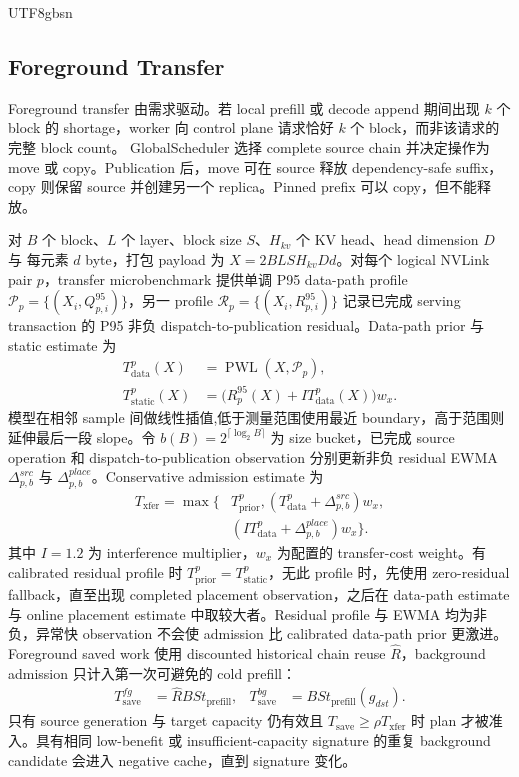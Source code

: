 \documentclass[11pt,a4paper]{article}
\begin{document}
\begin{CJK*}{UTF8}{gbsn}
\subsection{Foreground Transfer}

Foreground transfer 由需求驱动。若 local prefill 或 decode append 期间出现 $k$ 个 block 的
shortage，worker 向 control plane 请求恰好 $k$ 个 block，而非该请求的完整 block count。
GlobalScheduler 选择 complete source chain 并决定操作为 move 或 copy。Publication 后，move
可在 source 释放 dependency-safe suffix，copy 则保留 source 并创建另一个 replica。Pinned
prefix 可以 copy，但不能释放。

对 $B$ 个 block、$L$ 个 layer、block size $S$、$H_{kv}$ 个 KV head、head dimension $D$ 与
每元素 $d$ byte，打包 payload 为 $X=2BLSH_{kv}Dd$。对每个 logical NVLink pair $p$，transfer
microbenchmark 提供单调 P95 data-path profile $\mathcal{P}_p=\{(X_i,Q^{95}_{p,i})\}$，另一
profile $\mathcal{R}_p=\{(X_i,R^{95}_{p,i})\}$ 记录已完成 serving transaction 的 P95 非负
dispatch-to-publication residual。Data-path prior 与 static estimate 为
\begin{align}
 T_{\mathrm{data}}^{p}(X) &= \operatorname{PWL}(X,\mathcal{P}_p), \\
 T_{\mathrm{static}}^{p}(X) &= \bigl(R^{95}_{p}(X)+I T_{\mathrm{data}}^{p}(X)\bigr)w_x.
\end{align}
模型在相邻 sample 间做线性插值,低于测量范围使用最近 boundary，高于范围则延伸最后一段
slope。令 $b(B)=2^{\lceil\log_2 B\rceil}$ 为 size bucket，已完成 source operation 和
dispatch-to-publication observation 分别更新非负 residual EWMA $\Delta^{src}_{p,b}$ 与
$\Delta^{place}_{p,b}$。Conservative admission estimate 为
\begin{equation}
\begin{aligned}
 T_{\mathrm{xfer}}=\max\bigl\{&T_{\mathrm{prior}}^{p},
 (T_{\mathrm{data}}^{p}+\Delta^{src}_{p,b})w_x,\\
 &(I T_{\mathrm{data}}^{p}+\Delta^{place}_{p,b})w_x\bigr\}.
\end{aligned}
\end{equation}
其中 $I=1.2$ 为 interference multiplier，$w_x$ 为配置的 transfer-cost weight。有 calibrated
residual profile 时 $T_{\mathrm{prior}}^{p}=T_{\mathrm{static}}^{p}$，无此 profile 时，先使用
zero-residual fallback，直至出现 completed placement observation，之后在 data-path estimate
与 online placement estimate 中取较大者。Residual profile 与 EWMA 均为非负，异常快 observation
不会使 admission 比 calibrated data-path prior 更激进。Foreground saved work 使用 discounted
historical chain reuse $\widehat{R}$，background admission 只计入第一次可避免的 cold prefill：
\begin{align}
 T_{\mathrm{save}}^{fg} &= \widehat{R}BS t_{\mathrm{prefill}}, &
 T_{\mathrm{save}}^{bg} &= BS t_{\mathrm{prefill}}(g_{dst}).
\end{align}
只有 source generation 与 target capacity 仍有效且 $T_{\mathrm{save}}\ge\rho T_{\mathrm{xfer}}$
时 plan 才被准入。具有相同 low-benefit 或 insufficient-capacity signature 的重复 background
candidate 会进入 negative cache，直到 signature 变化。


\end{CJK*}
\end{document}
